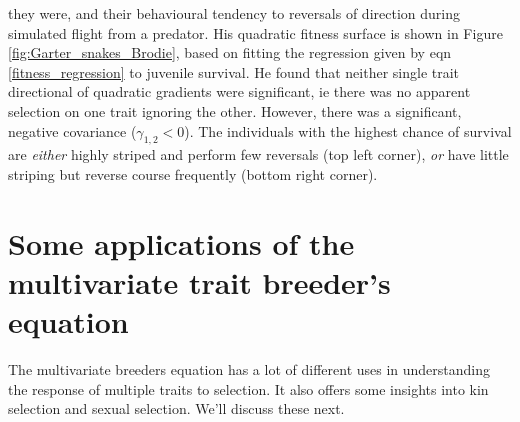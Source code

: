 they were, and their behavioural tendency to reversals of direction
during simulated flight from a predator. His quadratic fitness surface is shown in Figure
\ref{fig:Garter_snakes_Brodie}, based on fitting the
regression given by eqn \eqref{fitness_regression} to juvenile
survival. He found that neither single trait directional of quadratic
gradients were significant, ie there was no apparent selection on one 
trait ignoring the other. However, there was a significant, negative
covariance ($\gamma_{1,2}<0$). The individuals with the highest chance of survival are
{\it either} highly striped and perform few reversals (top left
corner), {\it or} have little striping but reverse course frequently
(bottom right corner). 

\section{Some applications of the multivariate trait breeder's equation}

The multivariate breeders equation has a lot of different uses in understanding the response of multiple traits to selection. It also offers some insights into kin selection and sexual selection. We'll discuss these next.

